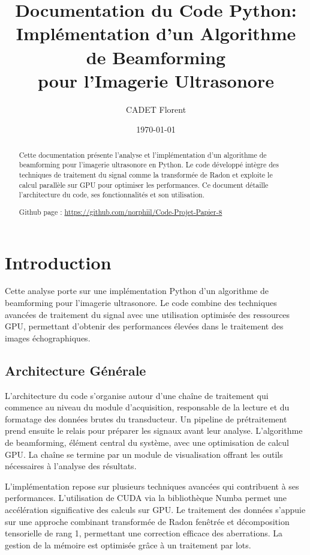 \documentclass[12pt,a4paper]{article}
\title{Documentation du Code Python:\\Implémentation d'un Algorithme de Beamforming\\pour l'Imagerie Ultrasonore}
\author{CADET Florent}
\date{\today}
\begin{document}
\maketitle

\bigskip
\bigskip
\bigskip

\begin{abstract}
Cette documentation présente l'analyse et l'implémentation d'un algorithme de beamforming pour l'imagerie ultrasonore en Python. Le code développé intègre des techniques de traitement du signal comme la transformée de Radon et exploite le calcul parallèle sur GPU pour optimiser les performances. Ce document détaille l'architecture du code, ses fonctionnalités et son utilisation.

\bigskip
Github page : \url{https://github.com/norphiil/Code-Projet-Papier-8}
\end{abstract}

\clearpage 
{}
\tableofcontents

\clearpage
\section{Introduction}
Cette analyse porte sur une implémentation Python d'un algorithme de beamforming pour l'imagerie ultrasonore. Le code combine des techniques avancées de traitement du signal avec une utilisation optimisée des ressources GPU, permettant d'obtenir des performances élevées dans le traitement des images échographiques.

\subsection{Architecture Générale}
L'architecture du code s'organise autour d'une chaîne de traitement qui commence au niveau du module d'acquisition, responsable de la lecture et du formatage des données brutes du transducteur. Un pipeline de prétraitement prend ensuite le relais pour préparer les signaux avant leur analyse. L'algorithme de beamforming, élément central du système, avec une optimisation de calcul GPU. La chaîne se termine par un module de visualisation offrant les outils nécessaires à l'analyse des résultats.

\bigskip
L'implémentation repose sur plusieurs techniques avancées qui contribuent à ses performances. L'utilisation de CUDA via la bibliothèque Numba permet une accélération significative des calculs sur GPU. Le traitement des données s'appuie sur une approche combinant transformée de Radon fenêtrée et décomposition tensorielle de rang 1, permettant une correction efficace des aberrations. La gestion de la mémoire est optimisée grâce à un traitement par lots.
\end{document}
